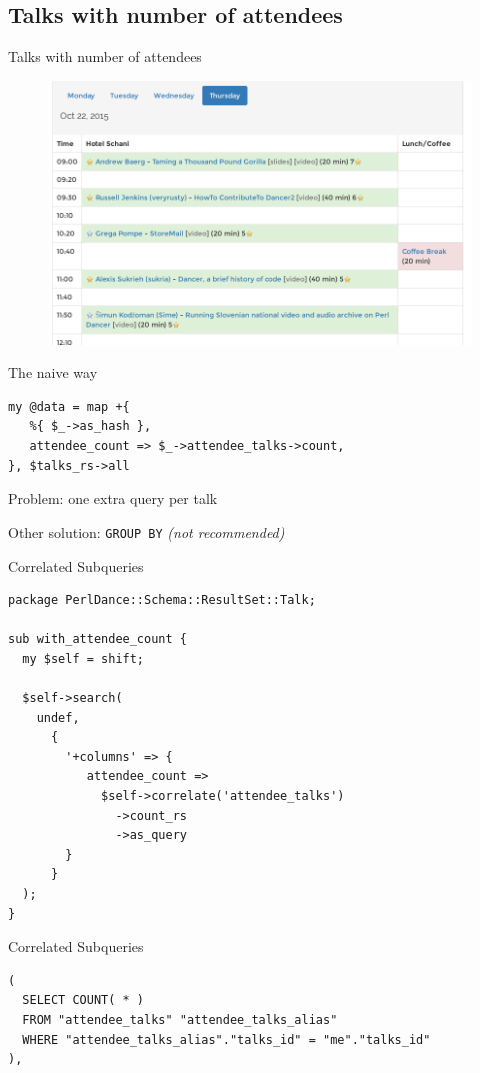 \subsection{Talks with number of attendees}

\begin{frame}{Talks with number of attendees}
\begin{figure}[!ht]
\centering
\includegraphics[width=0.8\linewidth]{img/schedule2015.png}
\end{figure}
\end{frame}

\begin{frame}[fragile]{The naive way}
\begin{lstlisting}
my @data = map +{
   %{ $_->as_hash },
   attendee_count => $_->attendee_talks->count,
}, $talks_rs->all
\end{lstlisting}

Problem: one extra query per talk

Other solution: \verb|GROUP BY| \textit{(not recommended)}
\end{frame}

\begin{frame}[fragile]{Correlated Subqueries}
\begin{lstlisting}
package PerlDance::Schema::ResultSet::Talk;

sub with_attendee_count {
  my $self = shift;

  $self->search(
    undef,
      {
        '+columns' => {
           attendee_count =>
             $self->correlate('attendee_talks')
               ->count_rs
               ->as_query
        }
      }
  );
}
\end{lstlisting}
\end{frame}

\begin{frame}[fragile]{Correlated Subqueries}
\begin{lstlisting}
( 
  SELECT COUNT( * ) 
  FROM "attendee_talks" "attendee_talks_alias" 
  WHERE "attendee_talks_alias"."talks_id" = "me"."talks_id"
), 
\end{lstlisting}
\end{frame}

